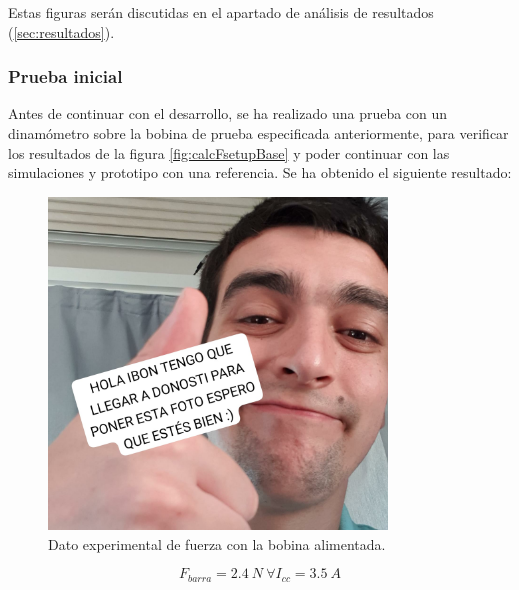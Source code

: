 Estas figuras serán discutidas en el apartado de análisis de resultados (\ref{sec:resultados}).

\subsubsection*{Prueba inicial}

Antes de continuar con el desarrollo, se ha realizado una prueba con un dinamómetro sobre la bobina de prueba especificada anteriormente, para verificar los resultados de la figura \ref{fig:calcFsetupBase} y poder continuar con las simulaciones y prototipo con una referencia. Se ha obtenido el siguiente resultado:

\begin{figure}[H]
    \centering
    \includegraphics[width=9cm]{FigurasMemoria/dinamometro.jpeg}
    \caption{Dato experimental de fuerza con la bobina alimentada.}
    \label{fig:dinamometro} %
\end{figure}

\[F_{barra}=2.4~N~\forall I_{cc}=3.5~A\]